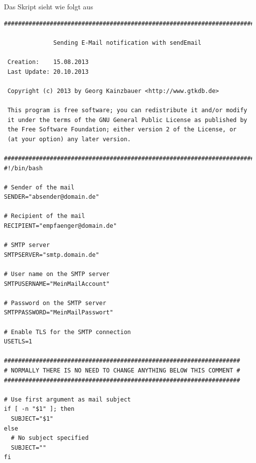 \documentclass[11pt,a4paper]{article} %
\begin{document}
Das Skript sieht wie folgt aus
\begin{frame}

\begin{lstlisting}
###########################################################################
                                                                     												  
              Sending E-Mail notification with sendEmail              									 
                                                                      											 
 Creation:    15.08.2013                                              										 
 Last Update: 20.10.2013                                               										 
                                                                       											
 Copyright (c) 2013 by Georg Kainzbauer <http://www.gtkdb.de>          							
                                                                      											 
 This program is free software; you can redistribute it and/or modify 								 
 it under the terms of the GNU General Public License as published by								  
 the Free Software Foundation; either version 2 of the License, or    								 
 (at your option) any later version.                                   									
                                                                       											
###########################################################################
#!/bin/bash

# Sender of the mail
SENDER="absender@domain.de"

# Recipient of the mail
RECIPIENT="empfaenger@domain.de"

# SMTP server
SMTPSERVER="smtp.domain.de"

# User name on the SMTP server
SMTPUSERNAME="MeinMailAccount"

# Password on the SMTP server
SMTPPASSWORD="MeinMailPasswort"

# Enable TLS for the SMTP connection
USETLS=1

###################################################################
# NORMALLY THERE IS NO NEED TO CHANGE ANYTHING BELOW THIS COMMENT #
###################################################################

# Use first argument as mail subject
if [ -n "$1" ]; then
  SUBJECT="$1"
else
  # No subject specified
  SUBJECT=""
fi


\end{lstlisting}
\end{frame}
\end{document}
